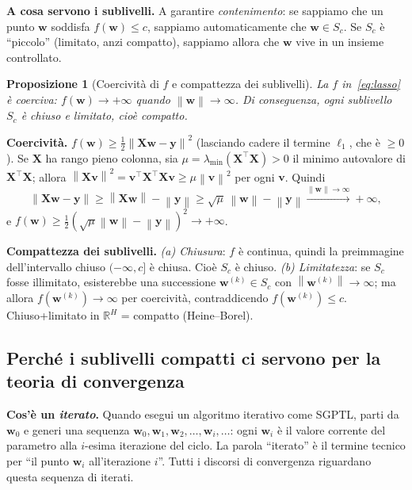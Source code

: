 \documentclass[11pt,a4paper]{article}
\newcommand{\R}{\mathbb{R}}
\newcommand{\norm}[1]{\left\|#1\right\|}
\newcommand{\bw}{\mathbf{w}}
\newcommand{\by}{\mathbf{y}}
\newcommand{\bX}{\mathbf{X}}
\newcommand{\bv}{\mathbf{v}}
\newtheorem{proposition}[theorem]{Proposizione}
\theoremstyle{definition}
\begin{document}
\textbf{A cosa servono i sublivelli.} A garantire \emph{contenimento}: se sappiamo che un punto $\bw$ soddisfa $f(\bw)\le c$, sappiamo automaticamente che $\bw\in S_c$. Se $S_c$ è ``piccolo'' (limitato, anzi compatto), sappiamo allora che $\bw$ vive in un insieme controllato.

\medskip
\begin{proposition}[Coercività di $f$ e compattezza dei sublivelli]
La $f$ in~\eqref{eq:lasso} è \emph{coerciva}: $f(\bw)\to+\infty$ quando $\norm{\bw}\to\infty$. Di conseguenza, ogni sublivello $S_c$ è chiuso e limitato, cioè \emph{compatto}.
\end{proposition}

\begin{tcolorbox}[proofbox]
\textbf{Coercività.} $f(\bw) \ge \tfrac{1}{2}\norm{\bX\bw-\by}^2$ (lasciando cadere il termine $\ell_1$, che è $\ge 0$). Se $\bX$ ha rango pieno colonna, sia $\mu = \lambda_{\min}(\bX^\top\bX) > 0$ il minimo autovalore di $\bX^\top\bX$; allora $\norm{\bX\bv}^2 = \bv^\top\bX^\top\bX\bv \ge \mu\norm{\bv}^2$ per ogni $\bv$. Quindi
\[
\norm{\bX\bw - \by} \ge \norm{\bX\bw} - \norm{\by} \ge \sqrt{\mu}\,\norm{\bw} - \norm{\by}
\xrightarrow{\norm{\bw}\to\infty} +\infty,
\]
e $f(\bw) \ge \tfrac{1}{2}(\sqrt{\mu}\norm{\bw}-\norm{\by})^2 \to +\infty$.

\textbf{Compattezza dei sublivelli.}
\emph{(a) Chiusura}: $f$ è continua, quindi la preimmagine dell'intervallo chiuso $(-\infty, c]$ è chiusa. Cioè $S_c$ è chiuso.
\emph{(b) Limitatezza}: se $S_c$ fosse illimitato, esisterebbe una successione $\bw^{(k)}\in S_c$ con $\norm{\bw^{(k)}}\to\infty$; ma allora $f(\bw^{(k)})\to\infty$ per coercività, contraddicendo $f(\bw^{(k)})\le c$.
Chiuso+limitato in $\R^H$ = compatto (Heine--Borel).
\end{tcolorbox}

\subsection{Perché i sublivelli compatti ci servono per la teoria di convergenza}

\textbf{Cos'è un \emph{iterato}.} Quando esegui un algoritmo iterativo come SGPTL, parti da $\bw_0$ e generi una sequenza $\bw_0, \bw_1, \bw_2, \dots, \bw_i, \dots$: ogni $\bw_i$ è il valore corrente del parametro alla $i$-esima iterazione del ciclo. La parola ``iterato'' è il termine tecnico per ``il punto $\bw_i$ all'iterazione $i$''. Tutti i discorsi di convergenza riguardano questa sequenza di iterati.
\end{document}
